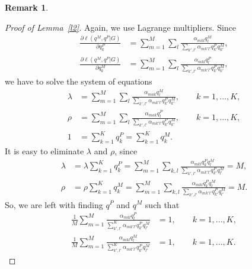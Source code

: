 \documentclass[12pt]{article}
\theoremstyle{definition}
\newtheorem{remark}{Remark}[section]
\begin{document}
\begin{remark}
\begin{enumerate}

  \end{enumerate}
\end{remark}

\begin{proof}[Proof of Lemma~\ref{l2}]
  Again, we use Lagrange multipliers. Since
  \begin{align*}
    \frac{\partial \ell(q^M, q^P|G)}{\partial q^P_k}
    & = \sum_{m=1}^M \sum_l \frac{\alpha_{mkl}q_l^M}{\sum_{k',l'} \alpha_{mk'l'}q^P_{k'}q^M_{k'}},
    \\
    \frac{\partial \ell(q^M, q^P|G)}{\partial q^M_k}
    & = \sum_{m=1}^M \sum_l \frac{\alpha_{mkl}q_l^P}{\sum_{k',l'} \alpha_{mk'l'}q^P_{k'}q^M_{k'}},
  \end{align*}
  we have to solve the system of equations
  \begin{align*}
    \lambda & = \sum_{m=1}^M \sum_l \frac{\alpha_{mak}q_l^M}{\sum_{k',l'} \alpha_{mk'l'}q^P_{k'}q^M_{k'}}, \qquad k=1,...,K,\\
    \rho & = \sum_{m=1}^M \sum_l \frac{\alpha_{mak}q_l^P}{\sum_{k',l'} \alpha_{mk'l'}q^P_{k'}q^M_{k'}}, \qquad k=1,...,K,
    \\
    1 & = \sum_{k=1}^K q^P_k = \sum_{k=1}^K q^M_k.
  \end{align*}
  It is easy to eliminate $\lambda$ and $\rho$, since
  \begin{align*}
    \lambda & = \lambda \sum_{k=1}^K q^P_k = \sum_{m=1}^M \sum_{k,l}
              \frac{\alpha_{mkl}q^P_kq_l^M}{\sum_{k',l'} \alpha_{mk'l'}q^P_{k'}q_{l'}^M} = M,
    \\
    \rho & = \rho \sum_{k=1}^K q_k^M = \sum_{m=1}^M \sum_{k,l}
           \frac{\alpha_{mkl}q^P_kq_l^M}{\sum_{k',l'} \alpha_{mk'l'}q^P_{k'}q_{l'}^M} = M.    
  \end{align*}
  So, we are left with finding $q^P$ and $q^M$ such that
  \begin{align*}
    \frac{1}{M}\sum_{m=1}^M \frac{\alpha_{mkl}q_l^P}{\sum_{k',l'}^K \alpha_{mk'l'}q^P_{k'} q^M_{l'}} & = 1, \qquad k=1,...,K,
    \\ \frac{1}{M}\sum_{m=1}^M \frac{\alpha_{mkl}q_l^M}{\sum_{k',l'}^K \alpha_{mk'l'}q^P_{k'} q^M_{l'}} & = 1, \qquad k=1,...,K.
  \end{align*}
\end{proof}
\end{document}
